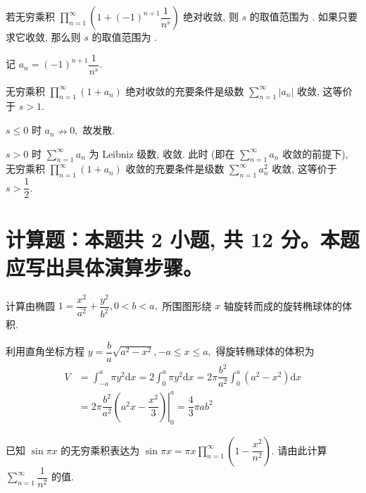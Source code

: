 \begin{question}
若无穷乘积 $\prod\limits_{n=1}^\infty \left( 1 + (-1)^{n+1} \dfrac{1}{n^s} \right)$ 绝对收敛, 则 $s$ 的取值范围为 \fillin[$s > 1$]. 如果只要求它收敛, 那么则 $s$ 的取值范围为 \fillin[$s > \dfrac{1}{2}$].
\end{question}

\begin{solution}
记 $a_n = (-1)^{n+1} \dfrac{1}{n^s}.$

无穷乘积 $\prod\limits_{n=1}^\infty (1 + a_n)$ 绝对收敛的充要条件是级数 $\sum\limits_{n=1}^\infty \lvert a_n \rvert$ 收敛, 这等价于 $s > 1.$

$s \leqslant 0$ 时 $a_n \nrightarrow 0,$ 故发散.

$s > 0$ 时 $\sum\limits_{n=1}^\infty a_n$ 为 Leibniz 级数, 收敛. 此时 (即在 $\sum\limits_{n=1}^\infty a_n$ 收敛的前提下), 无穷乘积 $\prod\limits_{n=1}^\infty (1 + a_n)$ 收敛的充要条件是级数 $\sum\limits_{n=1}^\infty a_n^2$ 收敛, 这等价于 $s > \dfrac{1}{2}.$
\end{solution}

\section{计算题：本题共 2 小题, 共 12 分。本题应写出具体演算步骤。}


\begin{question}[points = 6]
计算由椭圆 $1 = \dfrac{x^2}{a^2} + \dfrac{y^2}{b^2}, 0 < b < a,$ 所围图形绕 $x$ 轴旋转而成的旋转椭球体的体积.

\end{question}

\begin{solution}
利用直角坐标方程 $y = \dfrac{b}{a} \sqrt{a^2 - x^2}, -a \leqslant x \leqslant a,$ 得旋转椭球体的体积为
\begin{align*}
V & = \int_{-a}^a \pi y^2 \mathrm{d} x = 2 \int_0^a \pi y^2 \mathrm{d} x = 2 \pi \dfrac{b^2}{a^2} \int_0^a (a^2 - x^2) \mathrm{d} x \\
& = 2 \pi \dfrac{b^2}{a^2} \left. \left( a^2x - \dfrac{x^2}{3} \right) \right|_0^a = \dfrac{4}{3} \pi ab^2
\end{align*}
\end{solution}

\begin{question}[points = 6]
已知 $\sin \pi x$ 的无穷乘积表达为 $\sin \pi x = \pi x \prod\limits_{n=1}^{\infty} \left( 1 - \dfrac{x^2}{n^2} \right).$ 请由此计算 $\sum\limits_{n=1}^{\infty} \dfrac{1}{n^2}$ 的值.

\end{question}

